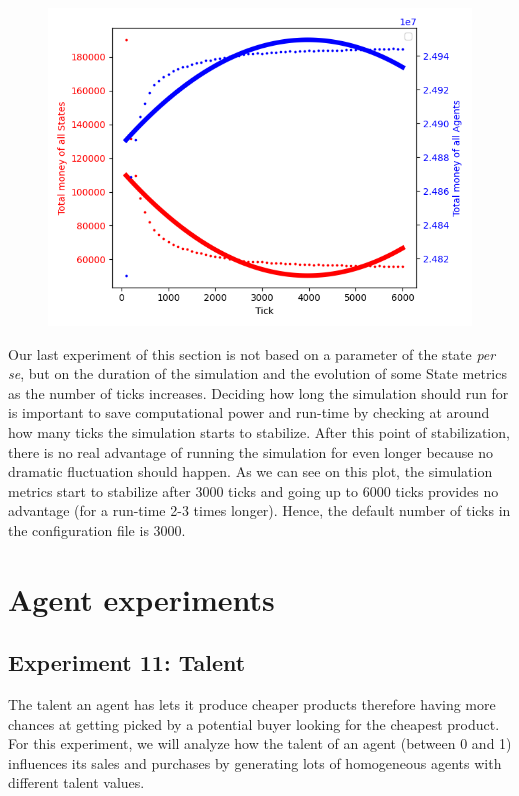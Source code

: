 {{{{{{{{{{        \begin{figure}
            \includegraphics[width=\linewidth]{img/exp/10_2.png}
        \end{figure} 
        { Our last experiment of this section is not based on a parameter of the state \emph{per se}, but on the duration of the simulation and the evolution of some State metrics as the number of ticks increases. Deciding how long the simulation should run for is important to save computational power and run-time by checking at around how many ticks the simulation starts to stabilize. After this point of stabilization, there is no real advantage of running the simulation for even longer because no dramatic fluctuation should happen.
        As we can see on this plot, the simulation metrics start to stabilize after 3000 ticks and going up to 6000 ticks provides no advantage (for a run-time 2-3 times longer). Hence, the default number of ticks in the configuration file is 3000.
        \par
    
\section{Agent experiments}

    \subsection{Experiment 11: Talent}\label{exp:talent}
    The talent an agent has lets it produce cheaper products therefore having more chances at getting picked by a potential buyer looking for the cheapest product. For this experiment, we will analyze how the talent of an agent (between 0 and 1) influences its sales and purchases by generating lots of homogeneous agents with different talent values.

}}}}}}}}}}}
